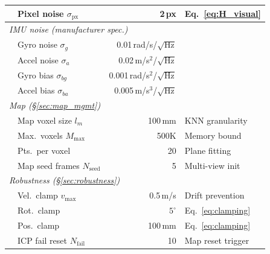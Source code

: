 \begin{table}[t]
\begin{tabular}{llrl}
        & Pixel noise $\sigma_\text{px}$ & 2\,px & Eq.~\eqref{eq:H_visual} \\
        \midrule
        \multicolumn{4}{l}{\textit{IMU noise (manufacturer spec.)}} \\
        & Gyro noise $\sigma_g$ & 0.01\,rad/s/$\sqrt{\text{Hz}}$ & \\
        & Accel noise $\sigma_a$ & 0.02\,m/s$^2$/$\sqrt{\text{Hz}}$ & \\
        & Gyro bias $\sigma_{bg}$ & 0.001\,rad/s$^2$/$\sqrt{\text{Hz}}$ & \\
        & Accel bias $\sigma_{ba}$ & 0.005\,m/s$^3$/$\sqrt{\text{Hz}}$ & \\
        \midrule
        \multicolumn{4}{l}{\textit{Map (\S\ref{sec:map_mgmt})}} \\
        & Map voxel size $l_m$ & 100\,mm & KNN granularity \\
        & Max.\ voxels $M_\text{max}$ & 500K & Memory bound \\
        & Pts.\ per voxel & 20 & Plane fitting \\
        & Map seed frames $N_\text{seed}$ & 5 & Multi-view init \\
        \midrule
        \multicolumn{4}{l}{\textit{Robustness (\S\ref{sec:robustness})}} \\
        & Vel.\ clamp $v_\text{max}$ & 0.5\,m/s & Drift prevention \\
        & Rot.\ clamp & $5^\circ$ & Eq.~\eqref{eq:clamping} \\
        & Pos.\ clamp & 100\,mm & Eq.~\eqref{eq:clamping} \\
        & ICP fail reset $N_\text{fail}$ & 10 & Map reset trigger \\
        \bottomrule
    \end{tabular}
\end{table}
